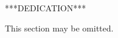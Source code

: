 \begin{dedication}
	\null\vfill
	\begin{center}
		***DEDICATION***

		This section may be omitted.
	\end{center}
	\vfill\vfill\null
\end{dedication}
